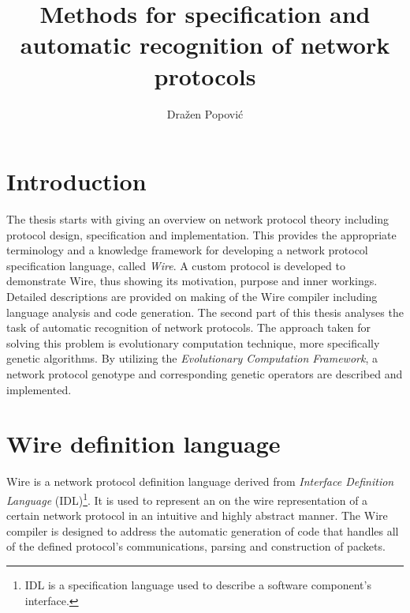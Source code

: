 \documentclass[times, utf8, diplomski]{fer}
\begin{document}

\title{Methods for specification and automatic recognition of network protocols}

\author{Dražen Popović}

\maketitle

\izvornik


\tableofcontents

\chapter{Introduction}
The thesis starts with giving an overview on network protocol theory including
protocol design, specification and implementation. This provides the appropriate
terminology and a knowledge framework for developing a network protocol specification
language, called \emph{Wire}. A custom protocol is developed to demonstrate Wire, thus
showing its motivation, purpose and inner workings. Detailed descriptions are 
provided on making of the Wire compiler including language analysis and code generation.
The second part of this thesis analyses the task of automatic recognition of
network protocols. The approach taken for solving this problem is evolutionary
computation technique, more specifically genetic algorithms. By utilizing the 
\emph{Evolutionary Computation Framework}, a network protocol genotype
and corresponding genetic operators are described and implemented.

\chapter{Wire definition language}
Wire is a network protocol definition language derived from \emph{Interface Definition Language} (IDL)\footnote{IDL is a specification language used to describe a software component's interface.}. 
It is used to represent an on the wire representation of a certain network protocol in an intuitive and highly abstract manner. 
The Wire compiler is designed to address the automatic generation of code that handles all of the defined protocol's communications, parsing and construction of packets. 
\end{document}
